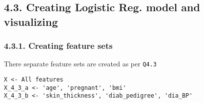 \documentclass[11pt]{article}
\begin{document}
    \hypertarget{creating-logistic-reg.-model-and-visualizing}{%
\subsection{4.3. Creating Logistic Reg. model and
visualizing}\label{creating-logistic-reg.-model-and-visualizing}}

    \hypertarget{creating-feature-sets}{%
\subsubsection{4.3.1. Creating feature
sets}\label{creating-feature-sets}}

There separate feature sets are created as per \texttt{Q4.3}

\begin{verbatim}
X <- All features
X_4_3_a <- 'age', 'pregnant', 'bmi'
X_4_3_b <- 'skin_thickness', 'diab_pedigree', 'dia_BP'
\end{verbatim}
\end{document}
